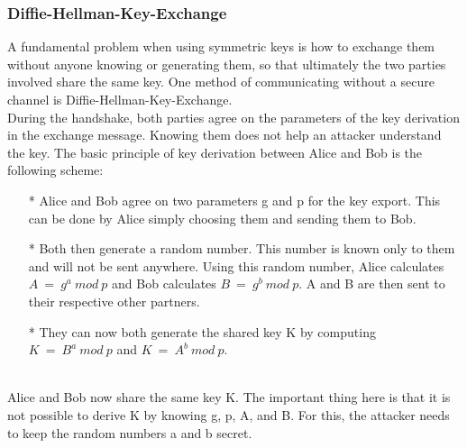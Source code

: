 \subsubsection{Diﬃe-Hellman-Key-Exchange}\cite{b38}
A fundamental problem when using symmetric keys is how to exchange them without anyone 
knowing or generating them, so that ultimately the two parties involved share the same 
key. One method of communicating without a secure channel is Diﬃe-Hellman-Key-Exchange.
\\
During the handshake, both parties agree on the parameters of the key derivation in the 
exchange message. Knowing them does not help an attacker understand the key. The basic 
principle of key derivation between Alice and Bob is the following scheme:

\begin{enumerate}[]
    \item[*] Alice and Bob agree on two parameters g and p for the key export. This can be done by Alice simply choosing them and sending them to Bob.
    \item[*] Both then generate a random number. This number is known only to them and will not be sent anywhere. Using this random number, Alice calculates $A \ = \ g^a \ mod \ p$ and Bob calculates $B \ = \ g^b \ mod \ p$. A and B are then sent to their respective other partners.
    \item[*] They can now both generate the shared key K by computing $K \ = \ B^a \ mod \ p$ and $K \ = \ A^b \ mod \ p$.
    \end{enumerate}
\\
Alice and Bob now share the same key K. The important thing here is that it is not possible 
to derive K by knowing g, p, A, and B. For this, the attacker needs to keep the random numbers 
a and b secret.

